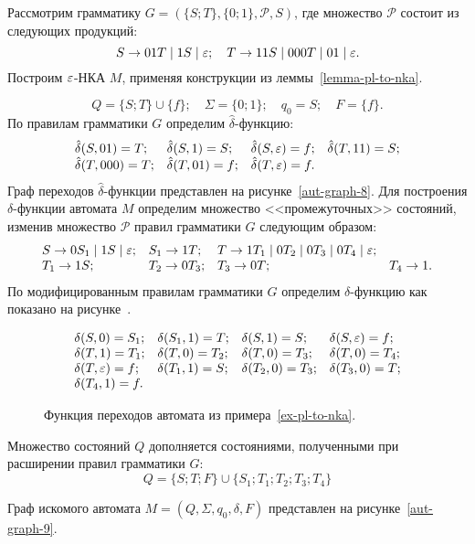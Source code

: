 \begin{myexample}
\label{ex-pl-to-nka}
	Рассмотрим грамматику $G = (\{S; T\}, \{0; 1\}, \mathcal P, S)$, где множество $\mathcal P$ состоит из следующих продукций:
	\[
			S \to 01T \mid 1S \mid \varepsilon; \quad
			T \to 11S \mid 000T \mid 01 \mid \varepsilon.
	\]
Построим $\varepsilon$-НКА $M$, применяя конструкции из леммы~\ref{lemma-pl-to-nka}.
	
\[
			Q = \{ S; T \} \cup \{ f \}; \quad
			\Sigma = \{ 0; 1 \}; \quad
			q_0 = S;\quad
			F = \{ f \}.
\]
		По правилам грамматики $G$ определим $\hat{\delta}$-функцию:
		\[
			\begin{array}{llll}
				\hat{\delta}(S, 01) = T; &
				\hat{\delta}(S, 1) = S; &
				\hat{\delta}(S, \varepsilon) = f; &
				\hat{\delta}(T, 11) = S; \\
				\hat{\delta}(T, 000) = T; &
				\hat{\delta}(T, 01) = f; &
				\hat{\delta}(T, \varepsilon) = f.&
		\end{array}
	\]
	Граф переходов $\hat{\delta}$-функции представлен на рисунке~\ref{aut-graph-8}.
	Для построения $\delta$-функции автомата $M$ определим множество <<промежуточных>> состояний, изменив множество $\mathcal P$ правил грамматики $G$ следующим образом:
	\[
			\begin{array}{llll}
				S \to 0S_1 \mid 1S \mid \varepsilon; &
				S_1 \to 1T; & 
				T \to 1T_1 \mid 0T_2 \mid 0T_3 \mid 0T_4 \mid \varepsilon; &\\
				T_1 \to 1S; &
				T_2 \to 0T_3; &
				T_3 \to 0T; &
				T_4 \to 1.
			\end{array}
	\]
	По модифицированным правилам грамматики $G$ определим ${\delta}$-функцию как показано на рисунке~\label{fig-ex-4-4}.

\begin{figure}
\label{fig-ex-4-4}
	\[
			\begin{array}{llll}
				\delta(S, 0) = S_1; &
				\delta(S_1, 1) = T; &
				\delta(S, 1) = S; &
				\delta(S, \varepsilon) = f; \\
				\delta(T, 1) = T_1; &
				\delta(T, 0) = T_2; &
				\delta(T, 0) = T_3; &
				\delta(T, 0) = T_4; \\
				\delta(T, \varepsilon) = f; &
				\delta(T_1, 1) = S; &
				\delta(T_2, 0) = T_3; &
				\delta(T_3, 0) = T; \\
				\delta(T_4, 1) = f. &&&
		\end{array}
	\]
\caption{Функция переходов автомата из примера~\ref{ex-pl-to-nka}.}
\end{figure}

	Множество состояний $Q$ дополняется состояниями, полученными при расширении правил грамматики $G$:
	\[
	Q = \{ S; T; F \} \cup \{ S_1; T_1; T_2; T_3; T_4 \}
	\]

	Граф искомого автомата $M = (Q, \Sigma, q_0, \delta, F)$ представлен на рисунке~\ref{aut-graph-9}.
\end{myexample}

